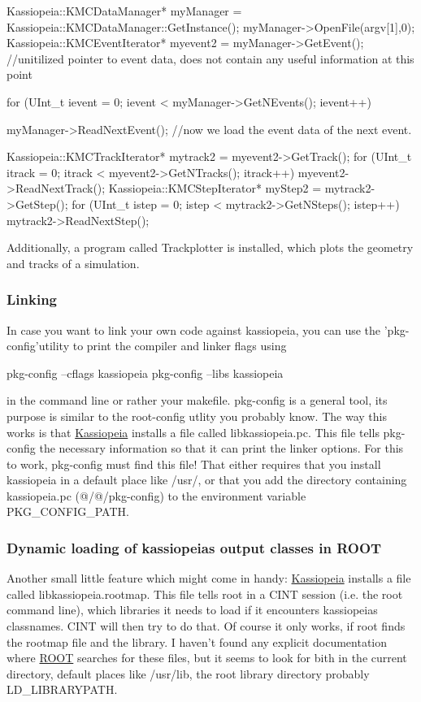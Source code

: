 \begin{DoxyCode}
  Kassiopeia::KMCDataManager* myManager = 
      Kassiopeia::KMCDataManager::GetInstance();
  myManager->OpenFile(argv[1],0);
  Kassiopeia::KMCEventIterator* myevent2 = myManager->GetEvent();
  //unitilized pointer to event data, does not contain any useful information at 
      this point

  for (UInt_t ievent = 0; ievent < myManager->GetNEvents(); ievent++){
      myManager->ReadNextEvent(); //now we load the event data of the next event.
      
      Kassiopeia::KMCTrackIterator* mytrack2 = myevent2->GetTrack();
      for (UInt_t itrack = 0; itrack < myevent2->GetNTracks(); itrack++){
          myevent2->ReadNextTrack();
          Kassiopeia::KMCStepIterator* myStep2 = mytrack2->GetStep();
          for (UInt_t istep = 0; istep < mytrack2->GetNSteps(); istep++){
              mytrack2->ReadNextStep();
          }
      }
  }
\end{DoxyCode}
 Additionally, a program called Trackplotter is installed, which plots the geometry and tracks of a simulation.\hypertarget{_k_s_output_KSlinking}{}\subsubsection{Linking}\label{_k_s_output_KSlinking}
In case you want to link your own code against kassiopeia, you can use the 'pkg-\/config'utility to print the compiler and linker flags using 
\begin{DoxyCode}
 pkg-config --cflags kassiopeia
 pkg-config --libs kassiopeia
\end{DoxyCode}
 in the command line or rather your makefile. pkg-\/config is a general tool, its purpose is similar to the root-\/config utlity you probably know. The way this works is that \hyperlink{class_kassiopeia}{Kassiopeia} installs a file called libkassiopeia.pc. This file tells pkg-\/config the necessary information so that it can print the linker options. For this to work, pkg-\/config must find this file! That either requires that you install kassiopeia in a default place like /usr/, or that you add the directory containing kassiopeia.pc (@/@/pkg-\/config) to the environment variable PKG\_\-CONFIG\_\-PATH.\hypertarget{_k_s_output_KSdynamicLoading}{}\subsubsection{Dynamic loading of kassiopeias output classes in ROOT}\label{_k_s_output_KSdynamicLoading}
Another small little feature which might come in handy: \hyperlink{class_kassiopeia}{Kassiopeia} installs a file called libkassiopeia.rootmap. This file tells root in a CINT session (i.e. the root command line), which libraries it needs to load if it encounters kassiopeias classnames. CINT will then try to do that. Of course it only works, if root finds the rootmap file and the library. I haven't found any explicit documentation where \hyperlink{namespace_r_o_o_t}{ROOT} searches for these files, but it seems to look for bith in the current directory, default places like /usr/lib, the root library directory probably LD\_\-LIBRARYPATH.

